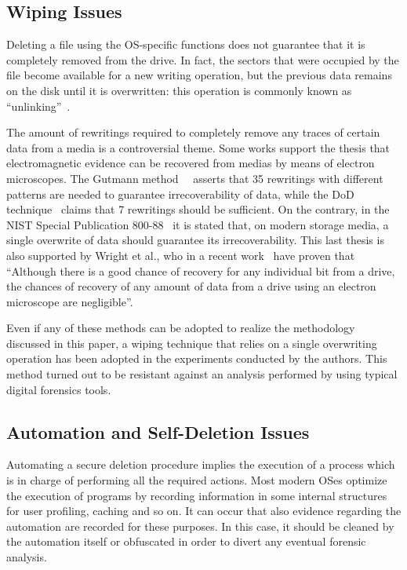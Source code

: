 \documentclass[conference]{IEEEtran}
\begin{document}
\subsection{Wiping Issues}
\label{wip1}
Deleting a file using the OS-specific functions does not guarantee that it is completely removed from the drive. In fact, the sectors that were occupied by the file become available for a new writing operation, but the previous data remains on the disk until it is overwritten: this operation is commonly known as ``unlinking''~\cite{os}.

The amount of rewritings required to completely remove any traces of certain data from a media is a controversial theme.
Some works support the thesis that electromagnetic evidence can be recovered from medias by means of electron microscopes. The Gutmann method~\cite{pgut01}~\cite{pgut02} asserts that 35 rewritings with different patterns are needed to guarantee irrecoverability of data, while the DoD technique~\cite{usdod5220} claims that 7 rewritings should be sufficient. On the contrary, in the NIST Special Publication 800-88~\cite{nist} it is stated that, on modern storage media, a single overwrite of data should guarantee its irrecoverability. This last thesis is also supported by Wright et al., who in a recent work~\cite{controversy} have proven that ``Although there is a good chance of recovery for any individual bit from a drive, the chances of recovery of any amount of data from a drive using an electron microscope are negligible''.

Even if any of these methods can be adopted to realize the methodology discussed in this paper, a wiping technique that relies on a single overwriting operation has been adopted in the experiments conducted by the authors. This method turned out to be resistant against an analysis performed by using typical digital forensics tools.


\subsection{Automation and Self-Deletion Issues}
\label{com_int}
Automating a secure deletion procedure implies the execution of a process which is in charge of performing all the required actions. Most modern OSes optimize the execution of programs by recording information in some internal structures for user profiling, caching and so on. It can occur that also evidence regarding the automation are recorded for these purposes.
In this case, it should be cleaned by the automation itself or obfuscated in order to divert any eventual forensic analysis.
\end{document}
